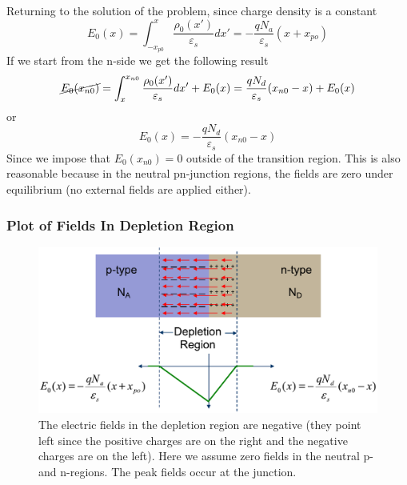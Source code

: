 Returning to the solution of the problem, since charge density is a constant
\begin{equation} 
	{E_0}(x) = \int_{ - {x_{p0}}}^x {\frac{{{\rho _0}(x')}}{{{\varepsilon _s}}}dx'}  =  - \frac{{q{N_a}}}{{{\varepsilon _s}}}(x + {x_{po}}) 
\end{equation}
If we start from the n-side we get the following result
\begin{equation} 
\cancel{{E_0}({x_{n0}})} = \int_x^{{x_{n0}}} {\frac{{{\rho _0}(x')}}{{{\varepsilon _s}}}dx'}  + {E_0}(x) = \frac{{q{N_d}}}{{{\varepsilon _s}}}({x_{n0}} - x) + {E_0}(x) 
\end{equation}
or
\begin{equation} 
	E_0(x) =  - \frac{{q{N_d}}}{{{\varepsilon _s}}}({x_{n0}} - x)
\end{equation}
Since we impose that $E_0(x_{n0}) = 0$ outside of the transition region.  This is also reasonable because in the neutral pn-junction regions, the fields are zero under equilibrium (no external fields are applied either).  
\subsubsection{Plot of Fields In Depletion Region}
\begin{figure}[tb]
\begin{center}
\includegraphics[width=.75\columnwidth]{slide18}
\end{center}
\caption{The electric fields in the depletion region are negative (they point left since the positive charges are on the right and the negative charges are on the left).  Here we assume zero fields in the neutral p- and n-regions.  The peak fields occur at the junction.}
\label{fig:slide18}
\end{figure}

